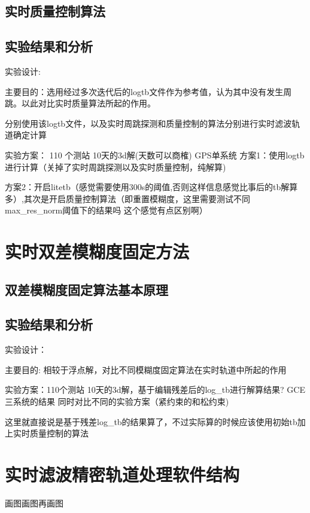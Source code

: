 \subsection{实时质量控制算法}


\subsection{实验结果和分析}

实验设计:

主要目的：选用经过多次迭代后的log\underline{\space}tb文件作为参考值，认为其中没有发生周跳。以此对比实时质量算法所起的作用。

分别使用该log\underline{\space}tb文件，以及实时周跳探测和质量控制的算法分别进行实时滤波轨道确定计算

实验方案： 110 个测站 10天的3d解(天数可以商榷) GPS单系统
方案1：使用log\underline{\space}tb进行计算（关掉了实时周跳探测以及实时质量控制，纯解算)

方案2：开启litetb（感觉需要使用300s的阈值,否则这样信息感觉比事后的tb解算多）,其次是开启质量控制算法（即重置模糊度，这里需要测试不同max\_res\_norm阈值下的结果吗 这个感觉有点区别啊）

\section{实时双差模糊度固定方法}

\subsection{双差模糊度固定算法基本原理}

\subsection{实验结果和分析}

实验设计：

主要目的:
相较于浮点解，对比不同模糊度固定算法在实时轨道中所起的作用

实验方案：110个测站  10天的3d解，基于编辑残差后的log\_tb进行解算结果? GCE三系统的结果
同时对比不同的实验方案（紧约束的和松约束)

这里就直接说是基于残差log\_tb的结果算了，不过实际算的时候应该使用初始tb加上实时质量控制的算法

\section{实时滤波精密轨道处理软件结构}

画图画图再画图

